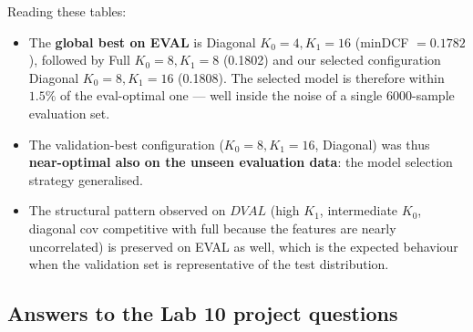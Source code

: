 \documentclass[11pt,a4paper]{article}
\begin{document}
Reading these tables:
\begin{itemize}
\item The \textbf{global best on EVAL} is Diagonal $K_0=4, K_1=16$
      (minDCF $=0.1782$), followed by Full $K_0=8, K_1=8$ (0.1802)
      and our selected configuration Diagonal $K_0=8, K_1=16$
      (0.1808). The selected model is therefore within $1.5\%$ of
      the eval-optimal one --- well inside the noise of a single
      6000-sample evaluation set.
\item The validation-best configuration ($K_0=8, K_1=16$, Diagonal)
      was thus \textbf{near-optimal also on the unseen evaluation
      data}: the model selection strategy generalised.
\item The structural pattern observed on $\mathit{DVAL}$ (high
      $K_1$, intermediate $K_0$, diagonal cov competitive with full
      because the features are nearly uncorrelated) is preserved on
      EVAL as well, which is the expected behaviour when the
      validation set is representative of the test distribution.
\end{itemize}

\subsection{Answers to the Lab 10 project questions}
\end{document}
